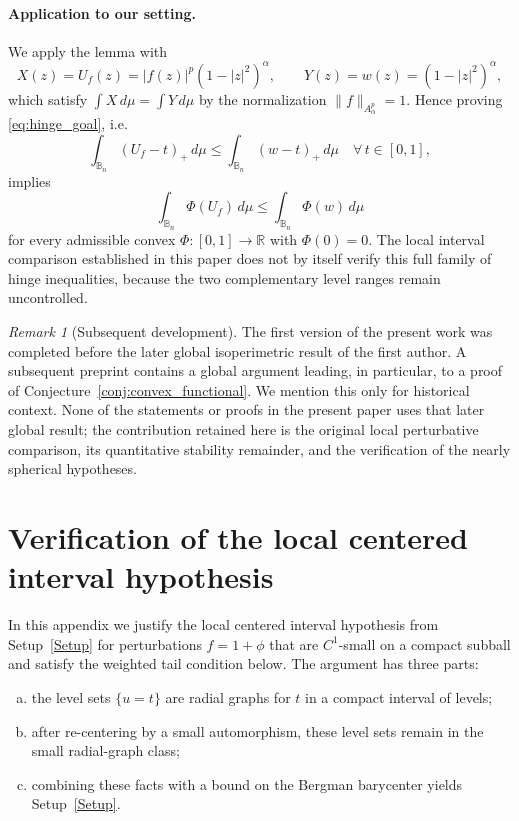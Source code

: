 \documentclass[11pt]{amsart}
\theoremstyle{plain}
\theoremstyle{definition}
\theoremstyle{remark}
\newtheorem{remark}[theorem]{Remark}
\newcommand{\B}{\mathbb{B}}
\newcommand{\R}{\mathbb{R}}
\begin{document}
\paragraph{\bf Application to our setting.}
We apply the lemma with
\[
X(z)=U_f(z)=|f(z)|^p(1-|z|^2)^\alpha,
\qquad
Y(z)=w(z)=(1-|z|^2)^\alpha,
\]
which satisfy $\int X\,d\mu=\int Y\,d\mu$ by the normalization
$\|f\|_{A^p_\alpha}=1$. Hence proving \eqref{eq:hinge_goal}, i.e.
\[
\int_{\B_n}(U_f-t)_+\,d\mu \le \int_{\B_n}(w-t)_+\,d\mu \quad \forall\,t\in[0,1],
\]
implies
\[
\int_{\B_n}\Phi(U_f)\,d\mu \le \int_{\B_n}\Phi(w)\,d\mu
\]
for every admissible convex $\Phi:[0,1]\to\R$ with $\Phi(0)=0$.
The local interval comparison established in this paper does not by itself
verify this full family of hinge inequalities, because the two complementary
level ranges remain uncontrolled.


\begin{remark}[Subsequent development]\label{rem:subsequent_development}
The first version of the present work was completed before the later global
isoperimetric result of the first author. A subsequent preprint
\cite{KalajGromovRos2026} contains a global argument leading, in particular, to
a proof of Conjecture~\ref{conj:convex_functional}. We mention this only for
historical context. None of the statements or proofs in the present paper uses
that later global result; the contribution retained here is the original local
perturbative comparison, its quantitative stability remainder, and the
verification of the nearly spherical hypotheses.
\end{remark}

\appendix

\section{Verification of the local centered interval hypothesis}\label{app:nearly_spherical_verification}

In this appendix we justify the local centered interval hypothesis from
Setup~\ref{Setup} for perturbations \(f=1+\phi\) that are \(C^1\)-small on a
compact subball and satisfy the weighted tail condition below.
The argument has three parts:
\begin{enumerate}[(a)]
\item the level sets \(\{u=t\}\) are radial graphs for \(t\) in a compact interval of levels;
\item after re-centering by a small automorphism, these level sets remain in the small radial-graph class;
\item combining these facts with a bound on the Bergman barycenter yields Setup~\ref{Setup}.
\end{enumerate}
\end{document}
